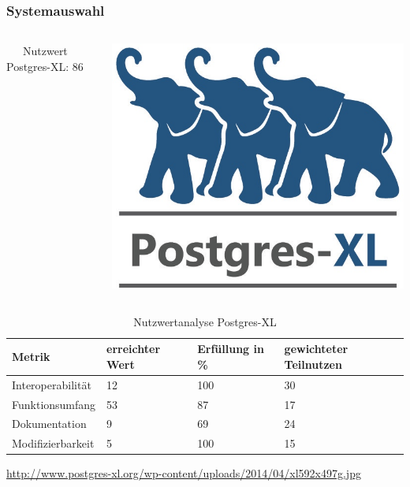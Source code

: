 \documentclass{beamer}
\begin{document}
\begin{frame}\frametitle{Systemauswahl}

   \begin{columns}
    \begin{column}{.5\textwidth}
\ \ \ Nutzwert Postgres-XL: 86
    \end{column}
    \begin{column}{.5\textwidth}
    \includegraphics[width=.45\hsize]{postgresxl.jpg}
    \end{column}
  \end{columns}

\begin{table}
\begin{tabular}{|l|p{1.8cm}|l|p{1.9cm}|}
\hline
\textbf{Metrik} & \textbf{erreichter Wert} & \textbf{Erfüllung in \%} & \textbf{gewichteter Teilnutzen} \\ \hline
Interoperabilität & 12 & 100 & 30 \\ \hline
Funktionsumfang & 53 & 87 & 17 \\ \hline
Dokumentation & 9 & 69 & 24 \\ \hline
Modifizierbarkeit & 5 & 100 & 15 \\ \hline
\end{tabular}
\caption{Nutzwertanalyse Postgres-XL}
\end{table}

\begin{center}
\tiny
\url{http://www.postgres-xl.org/wp-content/uploads/2014/04/xl592x497g.jpg}
\end{center}

\end{frame}
\end{document}
